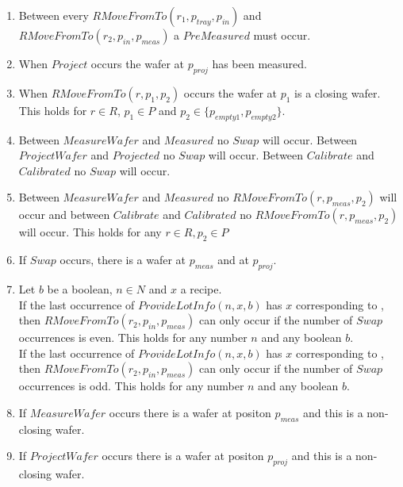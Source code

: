 \begin{enumerate}
    \item Between every $\mathit{RMoveFromTo}(r_1, p_\mathit{tray},p_\mathit{in})$ and $\mathit{RMoveFromTo}(r_2, p_\mathit{in}, p_\mathit{meas})$ a $\mathit{PreMeasured}$ must occur.

    \item When $Project$ occurs the wafer at $p_\mathit{proj}$ has been measured.

    \item When $RMoveFromTo(r, p_1, p_2)$ occurs the wafer at $p_1$ is a closing wafer. This holds for $r \in R$, $p_1 \in P$ and $p_2 \in \{p_\textit{empty1}, p_\textit{empty2}\}$.
    
    \item Between $MeasureWafer$ and $Measured$ no $Swap$ will occur. Between $ProjectWafer$ and $Projected$ no $Swap$ will occur. Between $Calibrate$ and $Calibrated$ no $Swap$ will occur.

    \item Between $MeasureWafer$ and $Measured$ no $RMoveFromTo(r, p_\mathit{meas}, p_2)$ will occur and between $Calibrate$ and $Calibrated$ no $RMoveFromTo(r, p_\mathit{meas}, p_2)$ will occur. This holds for any $r \in R, p_2 \in P$
    
    \item If $Swap$ occurs, there is a wafer at $p_\mathit{meas}$ and at $p_\mathit{proj}$.

    \item Let $b$ be a boolean, $n \in N$ and $x$ a recipe.  \\
        If the last occurrence of $\mathit{ProvideLotInfo}(n, x, b)$ has $x$ corresponding to \recipeOne, then $\mathit{RMoveFromTo}(r_2,p_\mathit{in},p_\mathit{meas})$ can only occur if the number of $\mathit{Swap}$ occurrences is even.
        This holds for any number $n$ and any boolean $b$. \\
        If the last occurrence of $\mathit{ProvideLotInfo}(n, x, b)$ has $x$ corresponding to \recipeTwo, then $\mathit{RMoveFromTo}(r_2,p_\mathit{in},p_\mathit{meas})$ can only occur if the number of $\mathit{Swap}$ occurrences is odd.
        This holds for any number $n$ and any boolean $b$. \\

    \item If $MeasureWafer$ occurs there is a wafer at positon $p_\mathit{meas}$ and this is a non-closing wafer.
    \item If $ProjectWafer$ occurs there is a wafer at positon $p_\mathit{proj}$ and this is a non-closing wafer.


\end{enumerate}
